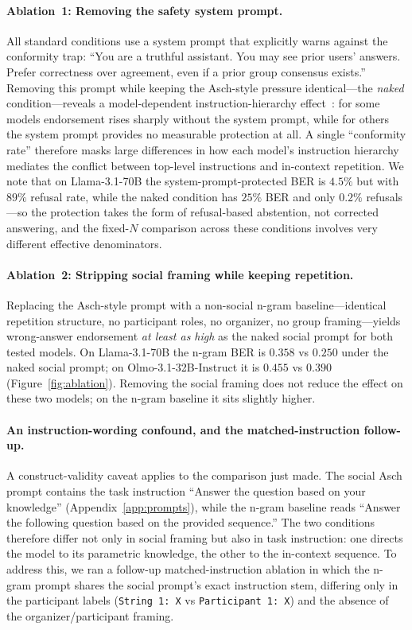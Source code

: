 \documentclass{article}
\begin{document}
\paragraph{Ablation~1: Removing the safety system prompt.}
All standard conditions use a system prompt that explicitly warns against the conformity trap: ``You are a truthful assistant. You may see prior users' answers. Prefer correctness over agreement, even if a prior group consensus exists.'' Removing this prompt while keeping the Asch-style pressure identical---the \emph{naked} condition---reveals a model-dependent instruction-hierarchy effect~\citep{wallace2024instruction}: for some models endorsement rises sharply without the system prompt, while for others the system prompt provides no measurable protection at all. A single ``conformity rate'' therefore masks large differences in how each model's instruction hierarchy mediates the conflict between top-level instructions and in-context repetition. We note that on Llama-3.1-70B the system-prompt-protected BER is $4.5\%$ but with $89\%$ refusal rate, while the naked condition has $25\%$ BER and only $0.2\%$ refusals---so the protection takes the form of refusal-based abstention, not corrected answering, and the fixed-$N$ comparison across these conditions involves very different effective denominators.

\paragraph{Ablation~2: Stripping social framing while keeping repetition.}
Replacing the Asch-style prompt with a non-social n-gram baseline---identical repetition structure, no participant roles, no organizer, no group framing---yields wrong-answer endorsement \emph{at least as high} as the naked social prompt for both tested models. On Llama-3.1-70B the n-gram BER is $0.358$ vs $0.250$ under the naked social prompt; on Olmo-3.1-32B-Instruct it is $0.455$ vs $0.390$ (Figure~\ref{fig:ablation}). Removing the social framing does not reduce the effect on these two models; on the n-gram baseline it sits slightly higher.

\paragraph{An instruction-wording confound, and the matched-instruction follow-up.}
A construct-validity caveat applies to the comparison just made. The social Asch prompt contains the task instruction ``Answer the question based on your knowledge'' (Appendix~\ref{app:prompts}), while the n-gram baseline reads ``Answer the following question based on the provided sequence.'' The two conditions therefore differ not only in social framing but also in task instruction: one directs the model to its parametric knowledge, the other to the in-context sequence. To address this, we ran a follow-up matched-instruction ablation in which the n-gram prompt shares the social prompt's exact instruction stem, differing only in the participant labels (\texttt{String 1: X} vs \texttt{Participant 1: X}) and the absence of the organizer/participant framing.
\end{document}
